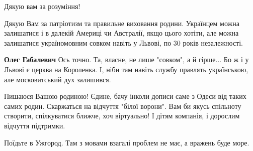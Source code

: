 \begin{itemize}
\begin{itemize}
Дякую вам за розуміння!
\end{itemize}

 

Дякую Вам за патріотизм та правильне виховання родини. Українцем можна
залишатися і в далекій Америці чи Австралії, якщо цього хотіти, але можна
залишатися україномовним совком навіть у Львові, по 30 років незалежності.

\begin{itemize}
 
\textbf{Олег Габалевич}
Ось точно. Та, власне, не лише "совком", а й гірше... Бо ж і у Львові є церква
на Короленка. І, ніби там навіть службу правлять українською, але московитський
дух залишився.
\end{itemize}

 

Пишаюся Вашою родиною! Єдине, бачу інколи дописи саме з Одеси від таких самих
родин. Скаржаться на відчуття "білої ворони". Вам би якусь спільноту
створити, спілкуватися ближче, хоч віртуально! І дітям компанія, і дорослим
відчуття підтримки.


 
Поїдьте в Ужгород. Там з мовами взагалі проблем не має, а вражень буде море.

\begin{itemize}
 

\end{itemize}
\end{itemize}
